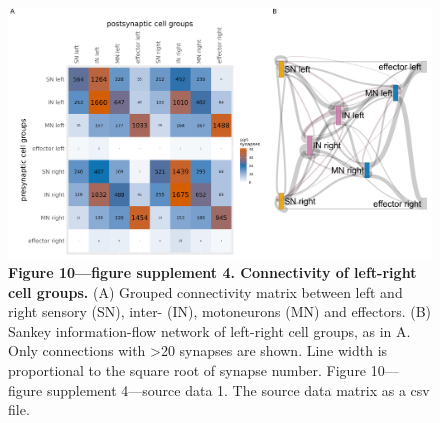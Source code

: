 \documentclass[
  11pt,
]{article}
\begin{document}
\begin{figure}[H]

{\centering \includegraphics[width=1\textwidth,height=\textheight]{Figures/Figure10_fig_suppl4.png}

}

\caption{\textbf{Figure 10---figure supplement 4. Connectivity of
left-right cell groups.} (A) Grouped connectivity matrix between left
and right sensory (SN), inter- (IN), motoneurons (MN) and effectors. (B)
Sankey information-flow network of left-right cell groups, as in A. Only
connections with \textgreater20 synapses are shown. Line width is
proportional to the square root of synapse number. Figure 10---figure
supplement 4---source data 1. The source data matrix as a csv file.}

\end{figure}%
\end{document}
